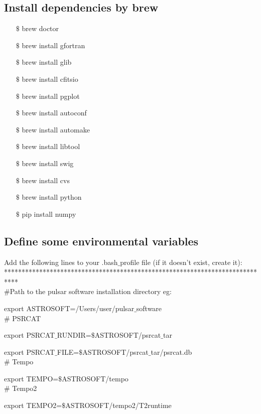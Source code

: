\documentclass{article}
\begin{document}
\subsection{Install dependencies by brew}
\begin{itemize}
\item[$\$$] brew doctor
\item[$\$$] brew install gfortran
\item[$\$$] brew install glib
\item[$\$$] brew install cfitsio
\item[$\$$] brew install pgplot
\item[$\$$] brew install autoconf
\item[$\$$] brew install automake
\item[$\$$] brew install libtool
\item[$\$$] brew install swig
\item[$\$$] brew install cvs
\item[$\$$] brew install python
\item[$\$$] pip install numpy
\end{itemize}





\subsection{Define some environmental variables}
Add the following lines to your .bash$\_$profile file (if it doesn't exist, create it): \\
****************************************************************************\\

$\#$Path to the pulsar software installation directory eg: 

export ASTROSOFT=/Users/{user}/pulsar$\_$software \\

$\#$ PSRCAT

export PSRCAT$\_$RUNDIR=$\$$ASTROSOFT/psrcat$\_$tar

export PSRCAT$\_$FILE=$\$$ASTROSOFT/psrcat$\_$tar/psrcat.db \\

$\#$ Tempo

export TEMPO=$\$$ASTROSOFT/tempo \\

$\#$ Tempo2

export TEMPO2=$\$$ASTROSOFT/tempo2/T2runtime \\
\end{document}
